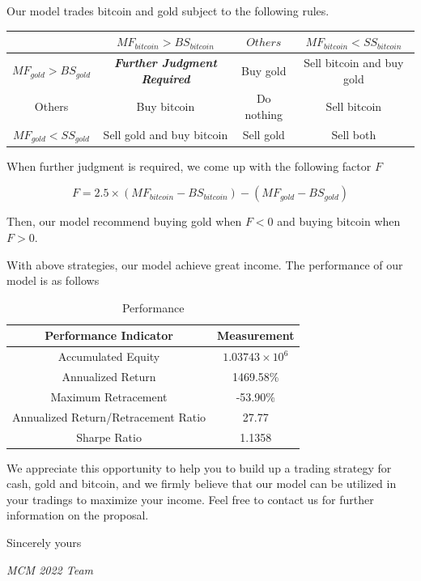 \documentclass[12pt,a4paper]{article}
\begin{document}
\begin{spacing}{1.2}
\begin{enumerate}
	Our model trades bitcoin and gold subject to the following rules.
	
	\begin{center}
		\begin{tabular}{ |c|c|c|c| } 
			\hline
			 & $MF_{bitcoin} > BS_{bitcoin}$ & $Others$ & $MF_{bitcoin} < SS_{bitcoin}$ \\ 
			\hline
			$MF_{gold} > BS_{gold}$ & \textbf{\textit{Further Judgment Required}}  & Buy gold & Sell bitcoin and buy gold  \\ 
			\hline
			Others & Buy bitcoin & Do nothing & Sell bitcoin \\
			\hline
			$MF_{gold} < SS_{gold}$ & Sell gold and buy bitcoin & Sell gold & Sell both \\ 
			\hline
		\end{tabular}
	\end{center}

	When further judgment is required, we come up with the following factor $F$ 
	
	$$
	F=2.5 \times (MF_{bitcoin}-BS_{bitcoin})-(MF_{gold}-BS_{gold})
	$$
	
	Then, our model recommend buying gold when $F<0$ and buying bitcoin when $F>0$.
\end{enumerate}

With above strategies, our model achieve great income. The performance of our model is as follows

	\begin{table}[H]
	\renewcommand{\arraystretch}{1.5}
	\caption{Performance}
	\label{table:memo_performance}
	\begin{center}
		{\footnotesize
			\begin{tabular}{c c }
				\toprule
				Performance Indicator & Measurement\\
				\midrule
				Accumulated Equity & $1.03743 \times 10^6$ \\
				Annualized Return & 1469.58\% \\
				Maximum Retracement & -53.90\% \\
				Annualized Return/Retracement Ratio & 27.77 \\
				Sharpe Ratio & 1.1358 \\
				\bottomrule
		\end{tabular}}
	\end{center}	
\end{table}


We appreciate this opportunity to help you to build up a trading strategy for cash, gold and bitcoin, and we firmly believe that our model can be utilized in your tradings to maximize your income. Feel free to contact us for further information on the proposal.

Sincerely yours

\textit{MCM 2022 Team}



\end{spacing}
\end{document}
